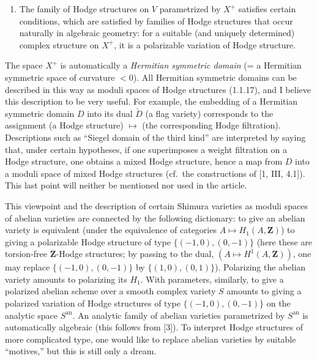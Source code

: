 \documentclass[10pt,a4paper]{article}
\providecommand{\tightlist}{\setlength{\itemsep}{0pt}\setlength{\parskip}{0pt}}
\newcommand{\SourcePage}[2]{\clearpage\setcounter{page}{#2}\typeout{D031_SOURCE_PAGE physical=#1 printed=#2}}
\begin{document}
\SourcePage{2}{248}
\begin{enumerate}
\def\labelenumi{(\alph{enumi})}
\setcounter{enumi}{1}
\tightlist
\item
  The family of Hodge structures on \(V\) parametrized by \(X^+\) satisfies certain conditions, which are satisfied by families of Hodge structures that occur naturally in algebraic geometry: for a suitable (and uniquely determined) complex structure on \(X^+\), it is a polarizable variation of Hodge structure.
\end{enumerate}

The space \(X^+\) is automatically a \emph{Hermitian symmetric domain} (= a Hermitian symmetric space of curvature \(<0\)). All Hermitian symmetric domains can be described in this way as moduli spaces of Hodge structures (1.1.17), and I believe this description to be very useful. For example, the embedding of a Hermitian symmetric domain \(D\) into its dual \(\check D\) (a flag variety) corresponds to the assignment (a Hodge structure) \(\mapsto\) (the corresponding Hodge filtration). Descriptions such as ``Siegel domain of the third kind'' are interpreted by saying that, under certain hypotheses, if one superimposes a weight filtration on a Hodge structure, one obtains a mixed Hodge structure, hence a map from \(D\) into a moduli space of mixed Hodge structures (cf.~the constructions of {[}1, III, 4.1{]}). This last point will neither be mentioned nor used in the article.

This viewpoint and the description of certain Shimura varieties as moduli spaces of abelian varieties are connected by the following dictionary: to give an abelian variety is equivalent (under the equivalence of categories \(A\mapsto H_1(A,\mathbf Z)\)) to giving a polarizable Hodge structure of type \(\{(-1,0),(0,-1)\}\) (here these are torsion-free \(\mathbf Z\)-Hodge structures; by passing to the dual, \((A\mapsto H^1(A,\mathbf Z))\), one may replace \(\{(-1,0),(0,-1)\}\) by \(\{(1,0),(0,1)\}\)). Polarizing the abelian variety amounts to polarizing its \(H_1\). With parameters, similarly, to give a polarized abelian scheme over a smooth complex variety \(S\) amounts to giving a polarized variation of Hodge structures of type \(\{(-1,0),(0,-1)\}\) on the analytic space \(S^{\mathrm{an}}\). An analytic family of abelian varieties parametrized by \(S^{\mathrm{an}}\) is automatically algebraic (this follows from {[}3{]}). To interpret Hodge structures of more complicated type, one would like to replace abelian varieties by suitable ``motives,'' but this is still only a dream.
\end{document}
